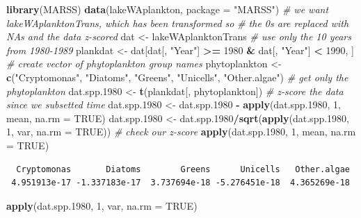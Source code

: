 \documentclass[
]{article}
\newenvironment{Shaded}{\begin{snugshade}}{\end{snugshade}}
\newcommand{\CommentTok}[1]{\textcolor[rgb]{0.56,0.35,0.01}{\textit{#1}}}
\newcommand{\DataTypeTok}[1]{\textcolor[rgb]{0.13,0.29,0.53}{#1}}
\newcommand{\DecValTok}[1]{\textcolor[rgb]{0.00,0.00,0.81}{#1}}
\newcommand{\FloatTok}[1]{\textcolor[rgb]{0.00,0.00,0.81}{#1}}
\newcommand{\KeywordTok}[1]{\textcolor[rgb]{0.13,0.29,0.53}{\textbf{#1}}}
\newcommand{\NormalTok}[1]{#1}
\newcommand{\OperatorTok}[1]{\textcolor[rgb]{0.81,0.36,0.00}{\textbf{#1}}}
\newcommand{\OtherTok}[1]{\textcolor[rgb]{0.56,0.35,0.01}{#1}}
\newcommand{\StringTok}[1]{\textcolor[rgb]{0.31,0.60,0.02}{#1}}
\begin{document}
\begin{Shaded}
\begin{Highlighting}[]
\KeywordTok{library}\NormalTok{(MARSS)}
\KeywordTok{data}\NormalTok{(lakeWAplankton, }\DataTypeTok{package =} \StringTok{"MARSS"}\NormalTok{)}
\CommentTok{# we want lakeWAplanktonTrans, which has been transformed so}
\CommentTok{# the 0s are replaced with NAs and the data z-scored}
\NormalTok{dat <-}\StringTok{ }\NormalTok{lakeWAplanktonTrans}
\CommentTok{# use only the 10 years from 1980-1989}
\NormalTok{plankdat <-}\StringTok{ }\NormalTok{dat[dat[, }\StringTok{"Year"}\NormalTok{] }\OperatorTok{>=}\StringTok{ }\DecValTok{1980} \OperatorTok{&}\StringTok{ }\NormalTok{dat[, }\StringTok{"Year"}\NormalTok{] }\OperatorTok{<}\StringTok{ }\DecValTok{1990}\NormalTok{, }
\NormalTok{    ]}
\CommentTok{# create vector of phytoplankton group names}
\NormalTok{phytoplankton <-}\StringTok{ }\KeywordTok{c}\NormalTok{(}\StringTok{"Cryptomonas"}\NormalTok{, }\StringTok{"Diatoms"}\NormalTok{, }\StringTok{"Greens"}\NormalTok{, }\StringTok{"Unicells"}\NormalTok{, }
    \StringTok{"Other.algae"}\NormalTok{)}
\CommentTok{# get only the phytoplankton}
\NormalTok{dat.spp}\FloatTok{.1980}\NormalTok{ <-}\StringTok{ }\KeywordTok{t}\NormalTok{(plankdat[, phytoplankton])}
\CommentTok{# z-score the data since we subsetted time}
\NormalTok{dat.spp}\FloatTok{.1980}\NormalTok{ <-}\StringTok{ }\NormalTok{dat.spp}\FloatTok{.1980} \OperatorTok{-}\StringTok{ }\KeywordTok{apply}\NormalTok{(dat.spp}\FloatTok{.1980}\NormalTok{, }\DecValTok{1}\NormalTok{, mean, }\DataTypeTok{na.rm =} \OtherTok{TRUE}\NormalTok{)}
\NormalTok{dat.spp}\FloatTok{.1980}\NormalTok{ <-}\StringTok{ }\NormalTok{dat.spp}\FloatTok{.1980}\OperatorTok{/}\KeywordTok{sqrt}\NormalTok{(}\KeywordTok{apply}\NormalTok{(dat.spp}\FloatTok{.1980}\NormalTok{, }\DecValTok{1}\NormalTok{, var, }
    \DataTypeTok{na.rm =} \OtherTok{TRUE}\NormalTok{))}
\CommentTok{# check our z-score}
\KeywordTok{apply}\NormalTok{(dat.spp}\FloatTok{.1980}\NormalTok{, }\DecValTok{1}\NormalTok{, mean, }\DataTypeTok{na.rm =} \OtherTok{TRUE}\NormalTok{)}
\end{Highlighting}
\end{Shaded}

\begin{verbatim}
  Cryptomonas       Diatoms        Greens      Unicells   Other.algae 
 4.951913e-17 -1.337183e-17  3.737694e-18 -5.276451e-18  4.365269e-18 
\end{verbatim}

\begin{Shaded}
\begin{Highlighting}[]
\KeywordTok{apply}\NormalTok{(dat.spp}\FloatTok{.1980}\NormalTok{, }\DecValTok{1}\NormalTok{, var, }\DataTypeTok{na.rm =} \OtherTok{TRUE}\NormalTok{)}
\end{Highlighting}
\end{Shaded}
\end{document}
